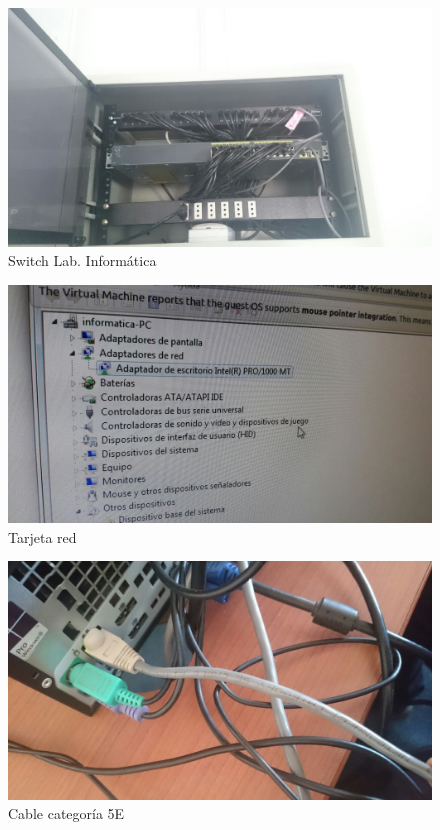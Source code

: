 \documentclass[onecolumn,11pts]{IEEEtran}
\begin{document}
\begin{figure}[h!]
\centering
 \includegraphics[scale=0.4]{switch}
\caption{Switch Lab. Informática}
\label{fig:switch}
\end{figure}

\begin{figure}[h!]
\centering
\includegraphics[scale=0.4]{tarjetared}
\caption{Tarjeta red}
\label{fig:tarjeta}
\end{figure}

\begin{figure}[h!]
\centering
\includegraphics[scale=0.3]{cable5e}
\caption{Cable categoría 5E}
\label{fig:cable red}
\end{figure}
\end{document}
